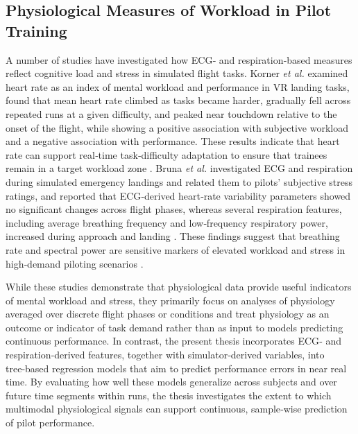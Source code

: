 \documentclass[11pt, a4paper]{article}
\begin{document}
\subsection{Physiological Measures of Workload in Pilot Training}
A number of studies have investigated how ECG‑ and respiration‑based measures reflect cognitive load and stress in simulated flight tasks. Korner \emph{et al.} \cite{koerner-2025} examined heart rate as an index of mental workload and performance in VR landing tasks, found that mean heart rate climbed as tasks became harder, gradually fell across repeated runs at a given difficulty, and peaked near touchdown relative to the onset of the flight, while showing a positive association with subjective workload and a negative association with performance. These results indicate that heart rate can support real‑time task‑difficulty adaptation to ensure that trainees remain in a target workload zone \cite{koerner-2025}. Bruna \emph{et al.} \cite{bruna-2018} investigated ECG and respiration during simulated emergency landings and related them to pilots’ subjective stress ratings, and reported that ECG‑derived heart‑rate variability parameters showed no significant changes across flight phases, whereas several respiration features, including average breathing frequency and low‑frequency respiratory power, increased during approach and landing \cite{bruna-2018}. These findings suggest that breathing rate and spectral power are sensitive markers of elevated workload and stress in high‑demand piloting scenarios \cite{bruna-2018}.

While these studies demonstrate that physiological data provide useful indicators of mental workload and stress, they primarily focus on analyses of physiology averaged over discrete flight phases or conditions and treat physiology as an outcome or indicator of task demand rather than as input to models predicting continuous performance. In contrast, the present thesis incorporates ECG‑ and respiration‑derived features, together with simulator‑derived variables, into tree‑based regression models that aim to predict performance errors in near real time. By evaluating how well these models generalize across subjects and over future time segments within runs, the thesis investigates the extent to which multimodal physiological signals can support continuous, sample‑wise prediction of pilot performance.
\end{document}
